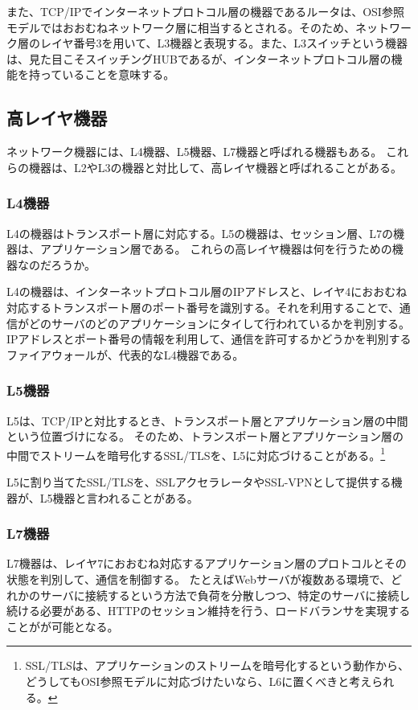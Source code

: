 また、TCP/IPでインターネットプロトコル層の機器であるルータは、OSI参照モデルではおおむねネットワーク層に相当するとされる。そのため、ネットワーク層のレイヤ番号3を用いて、L3機器と表現する。また、L3スイッチという機器は、見た目こそスイッチングHUBであるが、インターネットプロトコル層の機能を持っていることを意味する。

\subsection{高レイヤ機器}

ネットワーク機器には、L4機器、L5機器、L7機器と呼ばれる機器もある。
これらの機器は、L2やL3の機器と対比して、高レイヤ機器と呼ばれることがある。

\subsubsection{L4機器}

L4の機器はトランスポート層に対応する。L5の機器は、セッション層、L7の機器は、アプリケーション層である。
これらの高レイヤ機器は何を行うための機器なのだろうか。

L4の機器は、インターネットプロトコル層のIPアドレスと、レイヤ4におおむね対応するトランスポート層のポート番号を識別する。それを利用することで、通信がどのサーバのどのアプリケーションにタイして行われているかを判別する。
IPアドレスとポート番号の情報を利用して、通信を許可するかどうかを判別するファイアウォールが、代表的なL4機器である。

\subsubsection{L5機器}

L5は、TCP/IPと対比するとき、トランスポート層とアプリケーション層の中間という位置づけになる。
そのため、トランスポート層とアプリケーション層の中間でストリームを暗号化するSSL/TLSを、L5に対応づけることがある。\footnote{SSL/TLSは、アプリケーションのストリームを暗号化するという動作から、どうしてもOSI参照モデルに対応づけたいなら、L6に置くべきと考えられる。}

L5に割り当てたSSL/TLSを、SSLアクセラレータやSSL-VPNとして提供する機器が、L5機器と言われることがある。

\subsubsection{L7機器}

L7機器は、レイヤ7におおむね対応するアプリケーション層のプロトコルとその状態を判別して、通信を制御する。
たとえばWebサーバが複数ある環境で、どれかのサーバに接続するという方法で負荷を分散しつつ、特定のサーバに接続し続ける必要がある、HTTPのセッション維持を行う、ロードバランサを実現することがが可能となる。

